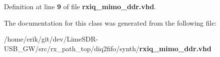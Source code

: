 Definition at line {\bf 9} of file {\bf rxiq\+\_\+mimo\+\_\+ddr.\+vhd}.



The documentation for this class was generated from the following file\+:\begin{DoxyCompactItemize}
\item 
/home/erik/git/dev/\+Lime\+S\+D\+R-\/\+U\+S\+B\+\_\+\+G\+W/src/rx\+\_\+path\+\_\+top/diq2fifo/synth/{\bf rxiq\+\_\+mimo\+\_\+ddr.\+vhd}\end{DoxyCompactItemize}
